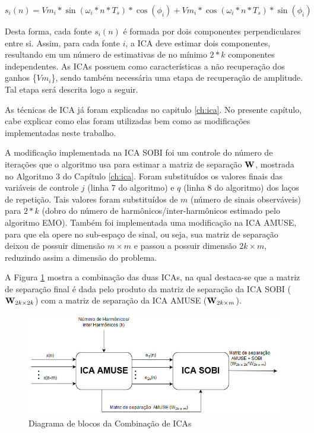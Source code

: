 \documentclass[a4paper,12pt]{monografia}
\theoremstyle{plain}
\theoremstyle{definition}
\theoremstyle{remark}
\begin{document}
\begin{equation}
    {s}_{i}(n)= Vm_{i}*\sin(\omega_{i}*n*T_s)*\cos(\phi_{i})+Vm_{i}*\cos(\omega_{i}*n*T_s)*\sin(\phi_{i})
    \label{eq:SinalEstimacao2}
\end{equation}

Desta forma, cada fonte ${s}_{i}(n)$ é formada por dois componentes perpendiculares entre si. Assim, para cada fonte $i$, a ICA deve estimar dois componentes, resultando em um número de estimativas de no mínimo $2*k$ componentes independentes. As ICAs possuem como características a não recuperação dos ganhos \{$Vm_{i}$\}, sendo também necessária uma etapa de recuperação de amplitude. Tal etapa será descrita logo a seguir.

As técnicas de ICA já foram explicadas no capitulo \ref{ch:ica}. No presente capítulo, cabe explicar como elas foram utilizadas bem como as modificações implementadas neste trabalho.

A modificação implementada na ICA SOBI foi um controle do número de iterações que o algoritmo usa para estimar a matriz de separação ${\bf W}$, mostrada no Algoritmo 3 do Capítulo \ref{ch:ica}. Foram substituídos os valores finais das variáveis de controle $j$ (linha 7 do algoritmo) e $q$ (linha 8 do algoritmo) dos laços de repetição. Tais valores foram substituídos de $m$ (número de sinais observáveis) para $2*k$ (dobro do número de harmônicos/inter-harmônicos estimado pelo algoritmo EMO). Também foi implementada uma modificação na ICA AMUSE, para que ela opere no sub-espaço de sinal, ou seja, sua matriz de separação deixou de possuir dimensão $m\times m$ e passou a possuir dimensão $2k\times m$, reduzindo assim a dimensão do problema.

A Figura \ref{fig:amusesobi} mostra a combinação das duas ICAs, na qual destaca-se que a matriz de separação final é dada pelo produto da matriz de separação da ICA SOBI (${\bf W}_{2k\times 2k}$) com a matriz de separação da ICA AMUSE (${\bf W}_{2k\times m}$).

\begin{figure}[!htb]
    \begin{center}
    \includegraphics[scale=0.6]{imagens/amuseesobi.jpg}
    \caption{Diagrama de blocos da Combinação de ICAs}
    \label{fig:amusesobi}
    \end{center}
\end{figure}
\end{document}
